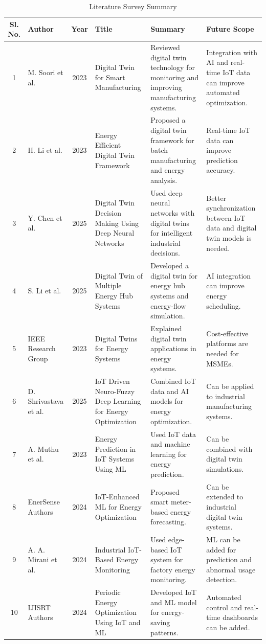 \begin{table}[h!]
\centering
\caption{Literature Survey Summary}
\label{tab:literature}
\begin{tabular}{|c|p{2.5cm}|c|p{3.0cm}|p{3.5cm}|p{3.0cm}|}
\hline
\textbf{Sl. No.} & \textbf{Author} & \textbf{Year} & \textbf{Title} & \textbf{Summary} & \textbf{Future Scope} \\
\hline
1 & M. Soori et al. & 2023 & Digital Twin for Smart Manufacturing & Reviewed digital twin technology for monitoring and improving manufacturing systems. & Integration with AI and real-time IoT data can improve automated optimization. \\
\hline
2 & H. Li et al. & 2023 & Energy Efficient Digital Twin Framework & Proposed a digital twin framework for batch manufacturing and energy analysis. & Real-time IoT data can improve prediction accuracy. \\
\hline
3 & Y. Chen et al. & 2025 & Digital Twin Decision Making Using Deep Neural Networks & Used deep neural networks with digital twins for intelligent industrial decisions. & Better synchronization between IoT data and digital twin models is needed. \\
\hline
4 & S. Li et al. & 2025 & Digital Twin of Multiple Energy Hub Systems & Developed a digital twin for energy hub systems and energy-flow simulation. & AI integration can improve energy scheduling. \\
\hline
5 & IEEE Research Group & 2023 & Digital Twins for Energy Systems & Explained digital twin applications in energy systems. & Cost-effective platforms are needed for MSMEs. \\
\hline
6 & D. Shrivastava et al. & 2025 & IoT Driven Neuro-Fuzzy Deep Learning for Energy Optimization & Combined IoT data and AI models for energy optimization. & Can be applied to industrial manufacturing systems. \\
\hline
7 & A. Muthu et al. & 2023 & Energy Prediction in IoT Systems Using ML & Used IoT data and machine learning for energy prediction. & Can be combined with digital twin simulations. \\
\hline
8 & EnerSense Authors & 2024 & IoT-Enhanced ML for Energy Optimization & Proposed smart meter-based energy forecasting. & Can be extended to industrial digital twin systems. \\
\hline
9 & A. A. Mirani et al. & 2024 & Industrial IoT-Based Energy Monitoring & Used edge-based IoT system for factory energy monitoring. & ML can be added for prediction and abnormal usage detection. \\
\hline
10 & IJISRT Authors & 2024 & Periodic Energy Optimization Using IoT and ML & Developed IoT and ML model for energy-saving patterns. & Automated control and real-time dashboards can be added. \\
\hline
\end{tabular}
\end{table}

